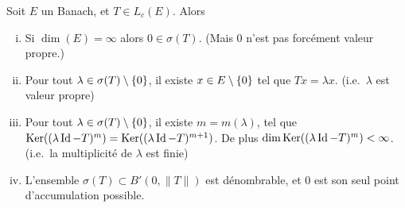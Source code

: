 \begin{corollary}
\label{corol:FredholmPrecise}
%
	Soit $E$ un Banach, et $T \in L_c(E)$. Alors %
	\begin{enumerate}[(i)]
		\item Si $\dim(E)=\infty$ alors $0 \in \sigma(T)$. (Mais $0$ n'est pas forcément valeur propre.)
		\item Pour tout $\lambda \in \sigma(T)\setminus \{0\}$, il existe $x \in E\setminus \{0\}$ tel que $T x = \lambda x$. (i.e.\ $\lambda$ est valeur propre)
		\item Pour tout $\lambda \in \sigma(T)\setminus \{0\}$, il existe $m = m(\lambda)$, tel que $\operatorname{Ker}( (\lambda\operatorname{Id}-T)^m ) = \operatorname{Ker}((\lambda\operatorname{Id}-T)^{m+1})$. De plus $\dim \operatorname{Ker}( (\lambda\operatorname{Id}-T)^m ) < \infty$. (i.e.\ la multiplicité de $\lambda$ est finie)
		\item L'ensemble $\sigma(T)\subset B'(0,\|T\|)$ est dénombrable, et $0$ est son seul point d'accumulation possible.
	\end{enumerate}
\end{corollary}

